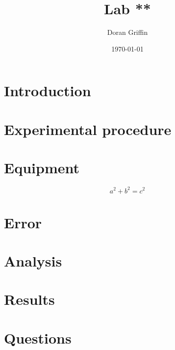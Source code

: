 \documentclass[aps,prl,preprint,groupedaddress,notitlepage]{revtex4-1}
\begin{document}
\title{Lab **}
\author{Doran Griffin}
\date{\today}
\maketitle
\section{Introduction}
\section{Experimental procedure}
\section{Equipment}
\begin{equation}
a^2+b^2=c^2
\end{equation}
\section{Error}
\section{Analysis}
\section{Results}
\pagebreak
\section{Questions}
\end{document}
